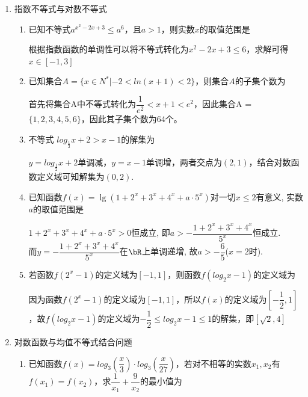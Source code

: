 \begin{enumerate}
\begin{enumerate}
\begin{jieda}
            \ps 其实$y=\dfrac{a^x-1}{a^x+1}$, $y=\dfrac{a^x+1}{a^x-1}$都是奇函数.
        \end{jieda}
    \end{enumerate}
    \item 指数不等式与对数不等式
    \begin{enumerate}
        \item 已知不等式$a^{x^2-2x+3} \leq a^6$，且$a > 1$，则实数$x$的取值范围是\blkda{$[-1, 3]$}
        \begin{jieda}
            根据指数函数的单调性可以将不等式转化为$x^2-2x+3 \leq 6$，求解可得$x \in [-1, 3]$
        \end{jieda}
        \item 已知集合$A = \{x \in N^* | -2 < ln(x+1) < 2\}$，则集合$A$的子集个数为
        \begin{jieda}
            首先将集合A中不等式转化为$\dfrac{1}{e^2} < x+1 < e^2$，因此集合A = $\{1,2,3,4,5,6\}$，因此其子集个数为64个。
        \end{jieda}
        \item 不等式 $log_{\frac{1}{2}}x+2 > x-1$的解集为
        \begin{jieda}
            $y = log_{\frac{1}{2}}x+2$单调减，$y = x-1$单调增，两者交点为$(2, 1)$，结合对数函数定义域可知解集为$(0, 2)$.
        \end{jieda}
        \item  已知函数$f(x)=\lg(1+2^x+3^x+4^x+a\cdot5^x)$对一切$x\leq 2$有意义, 实数$a$的取值范围是
        \begin{jieda}
        $1+2^x+3^x+4^x+a\cdot5^x>0$恒成立, 即$a>-\dfrac{1+2^x+3^x+4^x}{5^x}$恒成立. \\
        而$y=-\dfrac{1+2^x+3^x+4^x}{5^x}$在$\bR$上单调递增, 故$a>-\dfrac{6}{5}$($x=2$时). 
        \end{jieda}
        \item 若函数$f(2^x-1)$的定义域为$[-1, 1]$，则函数$f(log_2x - 1)$的定义域为\blkda{$[\sqrt{2}, 4]$}
        \begin{jieda}
            因为函数$f(2^x-1)$的定义域为$[-1, 1]$，所以$f(x)$的定义域为$[-\dfrac{1}{2}, 1]$，故$f(log_2x - 1)$的定义域为$-\dfrac{1}{2} \leq log_2x - 1 \leq 1$的解集，即$[\sqrt{2}, 4]$
        \end{jieda}
    \end{enumerate}
    \item 对数函数与均值不等式结合问题
    \begin{enumerate}
        \item 已知函数$f(x) = log_3\left(\dfrac{x}{3}\right) \cdot log_3\left(\dfrac{x}{27}\right)$，若对不相等的实数$x_1, x_2$有$f(x_1) = f(x_2)$，求$\dfrac{1}{x_1} + \dfrac{9}{x_2}$的最小值为

\end{enumerate}
\end{enumerate}
